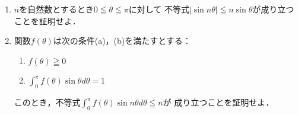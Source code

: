\documentclass[../../main.tex]{subfiles}
\begin{document}
\begin{enumerate}
  \item $n$を自然数とするとき$0\leqq\theta\leqq\pi$に対して
    不等式$|\sin n\theta| \leqq n\sin\theta$が成り立つことを証明せよ．
  \item 関数$f(\theta)$は次の条件(a)，(b)を満たすとする：
    \begin{enumerate}
      \item[(a)] $f(\theta)\geqq0$
      \item[(b)] $\displaystyle\int_0^\pi f(\theta)\sin\theta d\theta=1$
    \end{enumerate}
    このとき，不等式$\displaystyle\int_0^\pi f(\theta)\sin n\theta d\theta \leqq n$が
    成り立つことを証明せよ．
\end{enumerate}
\end{document}

